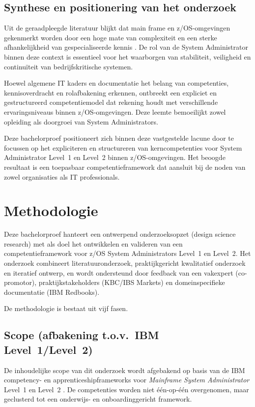 \subsection{Synthese en positionering van het onderzoek}

Uit de geraadpleegde literatuur blijkt dat main\- frame en z/OS-omgevingen gekenmerkt worden door een hoge mate van complexiteit en een sterke afhankelijkheid van gespecialiseerde kennis \autocite{IBMABCsZOSV1}. De rol van de System Administrator binnen deze context is essentieel voor het waarborgen van stabiliteit, veiligheid en continuïteit van bedrijfskritische systemen.

Hoewel algemene IT kaders en documentatie het belang van competenties, kennisoverdracht en rolafbakening erkennen, ontbreekt een expliciet en gestructureerd competentiemodel dat rekening houdt met verschillende ervaringsniveaus binnen z/OS-omgevingen. Deze leemte bemoeilijkt zowel opleiding als doorgroei van System Administrators.

Deze bachelorproef positioneert zich binnen deze vastgestelde lacune door te focussen op het expliciteren en structureren van kerncompetenties voor System Administrator Level~1 en Level~2 binnen z/OS-omgevingen. Het beoogde resultaat is een toepasbaar competentieframework dat aansluit bij de noden van zowel organisaties als IT professionals.


\section{Methodologie}
\label{sec:methodologie}

Deze bachelorproef hanteert een ontwerpend onderzoeksopzet (design science research) met als doel het ontwikkelen en valideren van een competentieframework voor z/OS System Administrators Level~1 en Level~2. Het onderzoek combineert literatuuronderzoek, praktijkgericht kwalitatief onderzoek en iteratief ontwerp, en wordt ondersteund door feedback van een vakexpert (co-promotor), praktijkstakeholders (KBC/IBS Markets) en domeinspecifieke documentatie (IBM Redbooks). 

De methodologie is bestaat uit vijf fasen.


\subsection{Scope (afbakening t.o.v.\ IBM Level~1/Level~2)}
De inhoudelijke scope van dit onderzoek wordt afgebakend op basis van de IBM competency- en apprenticeshipframeworks voor \textit{Mainframe System Administrator} Level~1 en Level~2 \autocite{IBMZSysAdminLevel1,IBMZSysAdminLevel2}. 
De competenties worden niet \'e\'en-op-\'e\'en overgenomen, maar geclusterd tot een onderwijs- en onboardinggericht framework.

